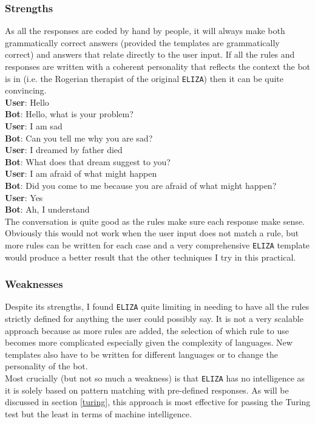 \documentclass{article}
\newcommand{\n}[0]{\\[\baselineskip]}
\begin{document}
\subsubsection{Strengths}
As all the responses are coded by hand by people, it will always make both grammatically correct answers (provided the templates are grammatically correct) and answers that relate directly to the user input. If all the rules and responses are written with a coherent personality that reflects the context the bot is in (i.e. the Rogerian therapist of the original \texttt{ELIZA}) then it can be quite convincing.
\n
\textbf{User}: Hello
\\ \textbf{Bot}: Hello, what is your problem?
\\ \textbf{User}: I am sad
\\ \textbf{Bot}: Can you tell me why you are sad?
\\ \textbf{User}: I dreamed by father died
\\ \textbf{Bot}: What does that dream suggest to you?
\\ \textbf{User}: I am afraid of what might happen
\\ \textbf{Bot}: Did you come to me because you are afraid of what might happen?
\\ \textbf{User}: Yes
\\ \textbf{Bot}: Ah, I understand
\n
The conversation is quite good as the rules make sure each response make sense. Obviously this would not work when the user input does not match a rule, but more rules can be written for each case and a very comprehensive \texttt{ELIZA} template would produce a better result that the other techniques I try in this practical. 

\subsubsection{Weaknesses}
Despite its strengths, I found \texttt{ELIZA} quite limiting in needing to have all the rules strictly defined for anything the user could possibly say. It is not a very scalable approach because as more rules are added, the selection of which rule to use becomes more complicated especially given the complexity of languages. New templates also have to be written for different languages or to change the personality of the bot.
\n
Most crucially (but not so much a weakness) is that \texttt{ELIZA} has no intelligence as it is solely based on pattern matching with pre-defined responses. As will be discussed in section \ref{turing}, this approach is most effective for passing the Turing test but the least in terms of machine intelligence.
\end{document}

